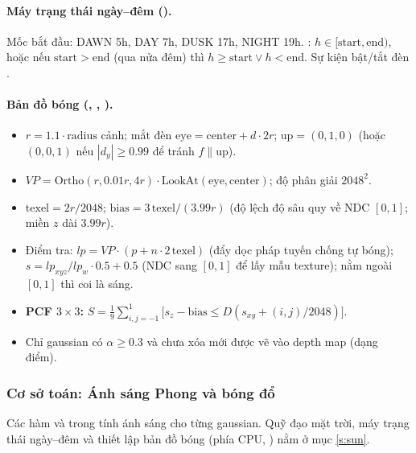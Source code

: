 \paragraph{Máy trạng thái ngày--đêm ().}
Mốc bắt đầu: DAWN 5h, DAY 7h, DUSK 17h, NIGHT 19h. : $h\in[\mathrm{start},\mathrm{end})$, hoặc nếu $\mathrm{start}>\mathrm{end}$ (qua nửa đêm) thì $h\ge\mathrm{start}\lor h<\mathrm{end}$. Sự kiện  bật/tắt đèn .

\paragraph{Bản đồ bóng (, , ).}
\begin{itemize}
\item $r=1.1\cdot\mathrm{radius}$ cảnh; mắt đèn $\mathrm{eye}=\mathrm{center}+d\cdot2r$; $\mathrm{up}=(0,1,0)$ (hoặc $(0,0,1)$ nếu $|d_y|\ge0.99$ để tránh $f\parallel\mathrm{up}$).
\item $VP=\mathrm{Ortho}(r,0.01r,4r)\cdot\mathrm{LookAt}(\mathrm{eye},\mathrm{center})$; độ phân giải $2048^2$.
\item $\mathrm{texel}=2r/2048$; $\mathrm{bias}=3\,\mathrm{texel}/(3.99r)$ (độ lệch độ sâu quy về NDC $[0,1]$; miền $z$ dài $3.99r$).
\item Điểm tra: $lp=VP\cdot(p+n\cdot2\,\mathrm{texel})$ (đẩy dọc pháp tuyến chống tự bóng); $s=lp_{xyz}/lp_w\cdot0.5+0.5$ (NDC sang $[0,1]$ để lấy mẫu texture); nằm ngoài $[0,1]$ thì coi là sáng.
\item \textbf{PCF $3\times3$:} $S=\frac19\sum_{i,j=-1}^{1}\big[s_z-\mathrm{bias}\le D(s_{xy}+(i,j)/2048)\big]$.
\item Chỉ gaussian có $\alpha\ge0.3$ và chưa xóa mới được vẽ vào depth map (dạng điểm).
\end{itemize}

\subsubsection{Cơ sở toán: Ánh sáng Phong và bóng đổ}\label{s:phong}
Các hàm  và  trong  tính ánh sáng cho từng gaussian. Quỹ đạo mặt trời, máy trạng thái ngày--đêm và thiết lập bản đồ bóng (phía CPU, ) nằm ở mục \ref{s:sun}.

